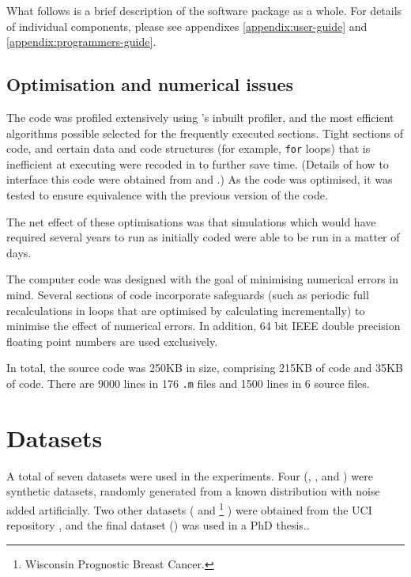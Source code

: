 What follows is a brief description of the software package as a
whole.  For details of individual components, please see appendixes
\ref{appendix:user-guide} and \ref{appendix:programmers-guide}.

\subsection{Optimisation and numerical issues}

The code was profiled extensively using \MATLAB's inbuilt profiler,
and the most efficient algorithms possible selected for the
frequently executed sections.  Tight sections of code, and certain
data and code structures (for example, {\tt for} loops) that \MATLAB
is inefficient at executing were recoded in \C to further save time.
(Details of how to interface this code were obtained from
\cite{MathWorks96} and \cite{MathWorks96a}.)
As the code was optimised, it was tested to ensure equivalence with
the previous version of the code.

The net effect of these optimisations was that simulations which would
have required several years to run as initially coded were able to be
run in a matter of days.

The computer code was designed with the goal of minimising numerical
errors in mind.  Several sections of code incorporate safeguards (such
as periodic full recalculations in loops that are optimised by
calculating incrementally) to minimise the effect of numerical
errors.  In addition, 64 bit IEEE double precision floating point
numbers are used exclusively.

In total, the source code was 250KB in size, comprising 215KB of
\MATLAB code and 35KB of \C code.  There are 9000 lines in 176 \MATLAB
{\tt .m} files and 1500 lines in 6 \C source files. 

\section{Datasets}

A total of seven datasets were used in the experiments.  Four
(, ,  and ) were
synthetic datasets, randomly generated from a known distribution with
noise added artificially.  Two other datasets ( and
%
\footnote{Wisconsin Prognostic Breast Cancer.}
) were obtained from the UCI repository \cite{UCI}, and the
final dataset () was used in a PhD thesis..

